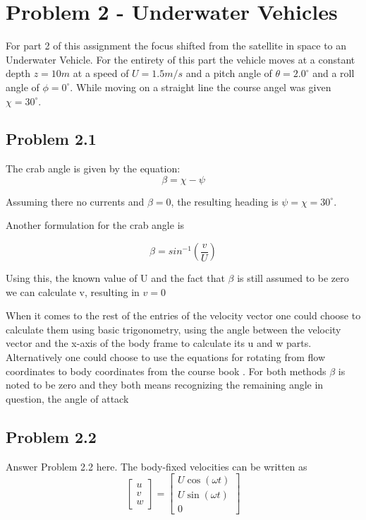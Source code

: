 \section*{Problem 2 - Underwater Vehicles}
For part 2 of this assignment the focus shifted from the satellite in space to an Underwater Vehicle. For the entirety of this part the vehicle moves at a constant depth $z=10m$ at a speed of $U=1.5m/s$ and a pitch angle of $\theta = 2.0^\circ$ and a roll angle of $\phi = 0^\circ$. While moving on a straight line the course angel was given $\chi = 30^\circ$.
\subsection*{Problem 2.1}
The crab angle is given by the equation:
\begin{equation}
    \beta = \chi - \psi
\end{equation}

Assuming there no currents and $\beta = 0$, the resulting heading is $\psi = \chi = 30^\circ$.

Another formulation for the crab angle is

\begin{equation}
    \beta = sin^{-1}(\frac{v}{U})
\end{equation}

Using this, the known value of U and the fact that $\beta$ is still assumed to be zero we can calculate v, resulting in $v=0$

When it comes to the rest of the entries of the velocity vector one could choose to calculate them using basic trigonometry, using the angle between the velocity vector and the x-axis of the body frame to calculate its u and w parts. Alternatively one could choose to use the equations for rotating from flow coordinates to body coordinates from the course book \cite{Fossen2011}. For both methods $\beta$ is noted to be zero and they both means recognizing the remaining angle in question, the angle of attack

\subsection*{Problem 2.2}
Answer Problem 2.2 here. The body-fixed velocities can be written as
\begin{equation}
\label{eq:velocity}
	\begin{bmatrix}
		u \\
		v \\
		w
	\end{bmatrix}
	= 
	\begin{bmatrix}
		U \cos( \omega t)\\
		U \sin(\omega t)\\
		0	
	\end{bmatrix}
\end{equation}


